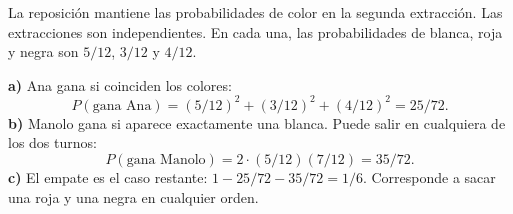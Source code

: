La reposición mantiene las probabilidades de color en la segunda extracción. Las extracciones son independientes. En cada una, las probabilidades de blanca, roja y negra son $5/12$, $3/12$ y $4/12$.

\textbf{a)} Ana gana si coinciden los colores:
\[
P(\text{gana Ana})=(5/12)^2+(3/12)^2+(4/12)^2=\boxed{25/72}.
\]
\textbf{b)} Manolo gana si aparece exactamente una blanca. Puede salir en cualquiera de los dos turnos:
\[
P(\text{gana Manolo})=2\cdot(5/12)(7/12)=\boxed{35/72}.
\]
\textbf{c)} El empate es el caso restante: $1-25/72-35/72=\boxed{1/6}$. Corresponde a sacar una roja y una negra en cualquier orden.
